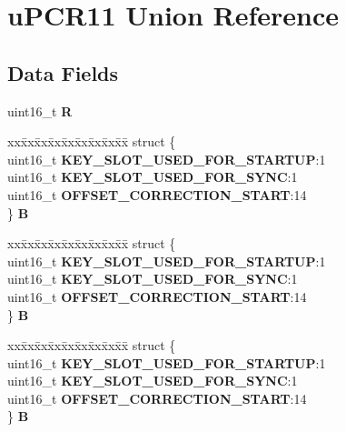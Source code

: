 \hypertarget{unionuPCR11}{}\section{u\+P\+C\+R11 Union Reference}
\label{unionuPCR11}
\subsection*{Data Fields}
\begin{DoxyCompactItemize}
\item 
\mbox{\label{unionuPCR11_acf9ea61e02b5d505759a8951d41329f2}} 
uint16\+\_\+t {\bfseries R}
\item 
\mbox{\label{unionuPCR11_a2003ffb6f188c58994af0086d610b349}} 
\begin{tabbing}
xx\=xx\=xx\=xx\=xx\=xx\=xx\=xx\=xx\=\kill
struct \{\\
\>uint16\_t {\bfseries KEY\_SLOT\_USED\_FOR\_STARTUP}:1\\
\>uint16\_t {\bfseries KEY\_SLOT\_USED\_FOR\_SYNC}:1\\
\>uint16\_t {\bfseries OFFSET\_CORRECTION\_START}:14\\
\} {\bfseries B}\\

\end{tabbing}\item 
\mbox{\label{unionuPCR11_a8bb3d0f455204eb2f508884a566f3759}} 
\begin{tabbing}
xx\=xx\=xx\=xx\=xx\=xx\=xx\=xx\=xx\=\kill
struct \{\\
\>uint16\_t {\bfseries KEY\_SLOT\_USED\_FOR\_STARTUP}:1\\
\>uint16\_t {\bfseries KEY\_SLOT\_USED\_FOR\_SYNC}:1\\
\>uint16\_t {\bfseries OFFSET\_CORRECTION\_START}:14\\
\} {\bfseries B}\\

\end{tabbing}\item 
\mbox{\label{unionuPCR11_ad0b8ea5345bf3e36b3764cf8626d88c1}} 
\begin{tabbing}
xx\=xx\=xx\=xx\=xx\=xx\=xx\=xx\=xx\=\kill
struct \{\\
\>uint16\_t {\bfseries KEY\_SLOT\_USED\_FOR\_STARTUP}:1\\
\>uint16\_t {\bfseries KEY\_SLOT\_USED\_FOR\_SYNC}:1\\
\>uint16\_t {\bfseries OFFSET\_CORRECTION\_START}:14\\
\} {\bfseries B}\\


\end{tabbing}
\end{DoxyCompactItemize}
